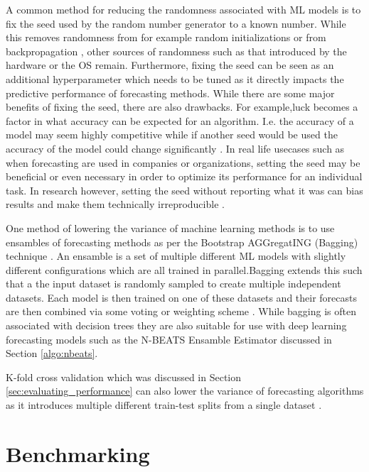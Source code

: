 A common method for reducing the randomness associated with ML models is to fix the seed used by the random number generator to a known number. While this removes randomness from for example random initializations or from backpropagation \cite{beam2020challenges}, other sources of randomness such as that introduced by the hardware or the OS remain. Furthermore, fixing the seed can be seen as an additional hyperparameter which needs to be tuned as it directly impacts the predictive performance of forecasting methods. While there are some major benefits of fixing the seed, there are also drawbacks. For example,luck becomes a factor in what accuracy can be expected for an algorithm. I.e. the accuracy of a model may seem highly competitive while if another seed would be used the accuracy of the model could change significantly \cite{beam2020challenges}. In real life usecases such as when forecasting are used in companies or organizations, setting the seed may be beneficial or even necessary in order to optimize its performance for an individual task. In research however, setting the seed without reporting what it was can bias results and make them technically irreproducible \cite{beam2020challenges,pineau2020improving,bouthillier2021accounting}.

One method of lowering the variance of machine learning methods is to use ensambles of forecasting methods as per the Bootstrap AGGregatING (Bagging) technique \cite{buhlmann2002analyzing}. An ensamble is a set of multiple different ML models with slightly different configurations which are all trained in parallel.Bagging extends this such that a the input dataset is randomly sampled to create multiple independent datasets. Each model is then trained on one of these datasets and their forecasts are then combined via some voting or weighting scheme \cite{buhlmann2002analyzing}. While bagging is often associated with decision trees they are also suitable for use with deep learning forecasting models such as the N-BEATS Ensamble Estimator discussed in Section \ref{algo:nbeats}.

K-fold cross validation which was discussed in Section \ref{sec:evaluating_performance} can also lower the variance of forecasting algorithms as it introduces multiple different train-test splits from a single dataset \cite{buhlmann2002analyzing}.

\section{Benchmarking}
\label{sec:related_work}

